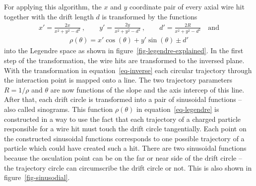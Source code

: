 For applying this algorithm, the $x$ and $y$ coordinate pair of every axial wire hit together with the drift length $d$ is transformed by the functions
\begin{align} x' = \frac{2x}{x^2 + y^2 - d^2}\ , \qquad y' = \frac{2y}{x^2 + y^2 - d^2}\ ,  \qquad d' = \frac{2R}{x^2 + y^2 - d^2}\quad \text{and} \label{eq-inverse} \end{align}
\begin{align}\rho(\theta) = x' \cos(\theta) + y' \sin(\theta) \pm d' \label{eq-legendre}\end{align}
into the Legendre space as shown in figure~\ref{fig-legendre-explained}. In the first step of the transformation, the wire hits are transformed to the inversed plane. With the transformation in equation~\ref{eq-inverse} each circular trajectory through the interaction point is mapped onto a line. The two trajectory parameters $R = 1/\rho$ and $\theta$ are now functions of the slope and the axis intercep of this line. After that, each drift circle is transformed into a pair of sinusoidal functions -- also called sinograms. This function $\rho(\theta)$ in equation~\ref{eq-legendre} is constructed in a way to use the fact that each trajectory of a charged particle responsible for a wire hit must touch the drift circle tangentially. Each point on the constructed sinusoidal functions corresponds to one possible trajectory of a particle which could have created such a hit. There are two sinusoidal functions because the osculation point can be on the far or near side of the drift circle -- the trajectory circle can circumscribe the drift circle or not. This is also shown in figure~\ref{fig-sinusodial}.

